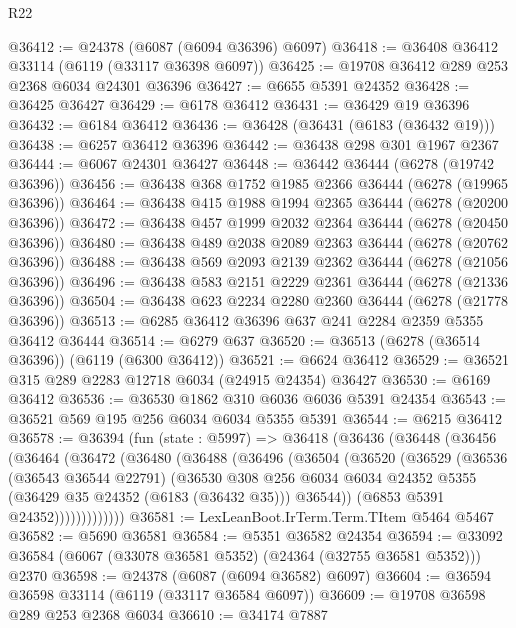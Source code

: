 \begin{lexlean}{R22}
\begin{coremodule}
@36412 := @24378 (@6087 (@6094 @36396) @6097)
@36418 := @36408 @36412 @33114 (@6119 (@33117 @36398 @6097))
@36425 := @19708 @36412 @289 @253 @2368 @6034 @24301 @36396
@36427 := @6655 @5391 @24352
@36428 := @36425 @36427
@36429 := @6178 @36412
@36431 := @36429 @19 @36396
@36432 := @6184 @36412
@36436 := @36428 (@36431 (@6183 (@36432 @19)))
@36438 := @6257 @36412 @36396
@36442 := @36438 @298 @301 @1967 @2367
@36444 := @6067 @24301 @36427
@36448 := @36442 @36444 (@6278 (@19742 @36396))
@36456 := @36438 @368 @1752 @1985 @2366 @36444 (@6278 (@19965 @36396))
@36464 := @36438 @415 @1988 @1994 @2365 @36444 (@6278 (@20200 @36396))
@36472 := @36438 @457 @1999 @2032 @2364 @36444 (@6278 (@20450 @36396))
@36480 := @36438 @489 @2038 @2089 @2363 @36444 (@6278 (@20762 @36396))
@36488 := @36438 @569 @2093 @2139 @2362 @36444 (@6278 (@21056 @36396))
@36496 := @36438 @583 @2151 @2229 @2361 @36444 (@6278 (@21336 @36396))
@36504 := @36438 @623 @2234 @2280 @2360 @36444 (@6278 (@21778 @36396))
@36513 := @6285 @36412 @36396 @637 @241 @2284 @2359 @5355 @36412 @36444
@36514 := @6279 @637
@36520 := @36513 (@6278 (@36514 @36396)) (@6119 (@6300 @36412))
@36521 := @6624 @36412
@36529 := @36521 @315 @289 @2283 @12718 @6034 (@24915 @24354) @36427
@36530 := @6169 @36412
@36536 := @36530 @1862 @310 @6036 @6036 @5391 @24354
@36543 := @36521 @569 @195 @256 @6034 @6034 @5355 @5391
@36544 := @6215 @36412
@36578 := @36394
    (fun (state : @5997) =>
    @36418
      (@36436
        (@36448
          (@36456
            (@36464
              (@36472
                (@36480
                  (@36488
                    (@36496
                      (@36504
                        (@36520
                          (@36529
                            (@36536
                              (@36543 @36544 @22791)
                              (@36530
                                @308
                                @256
                                @6034
                                @6034
                                @24352
                                @5355
                                (@36429 @35 @24352 (@6183 (@36432 @35)))
                                @36544))
                            (@6853 @5391 @24352)))))))))))))
@36581 := LexLeanBoot.IrTerm.Term.TItem @5464 @5467
@36582 := @5690 @36581
@36584 := @5351 @36582 @24354
@36594 := @33092 @36584 (@6067 (@33078 @36581 @5352) (@24364 (@32755 @36581 @5352))) @2370
@36598 := @24378 (@6087 (@6094 @36582) @6097)
@36604 := @36594 @36598 @33114 (@6119 (@33117 @36584 @6097))
@36609 := @19708 @36598 @289 @253 @2368 @6034
@36610 := @34174 @7887

\end{coremodule}
\end{lexlean}
